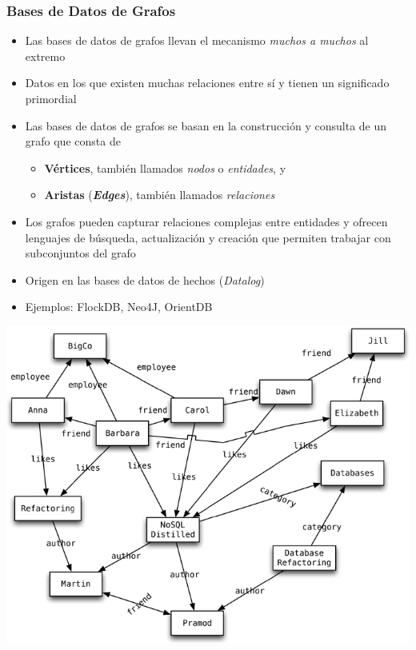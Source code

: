\documentclass[14pt]{beamer}
\begin{document}
\begin{frame}
  \frametitle{Bases de Datos de Grafos}
\vspace*{-1ex}
  \begin{itemize}
  \item Las bases de datos de grafos llevan el mecanismo {\em muchos a
      muchos} al extremo
\item Datos en los que existen muchas relaciones entre sí y
  tienen un significado primordial
\item Las bases de datos de grafos se basan en la construcción y consulta
  de un grafo que consta de
  \begin{itemize}
  \item {\bf Vértices}, también llamados {\em nodos} o {\em entidades}, y
  \item {\bf Aristas} ({\bfseries\itshape Edges}), también llamados {\em
      relaciones}
  \end{itemize}
\item Los grafos pueden capturar relaciones complejas entre
  entidades y ofrecen lenguajes de búsqueda, actualización y creación que
  permiten trabajar con subconjuntos del grafo
\item Origen en las bases de datos de hechos ({\em Datalog\/})
\item Ejemplos: FlockDB, Neo4J, OrientDB
\end{itemize}
\end{frame}

\begin{frame}[plain]
\includegraphics[width=\textwidth]{img/graph}
\end{frame}
\end{document}
